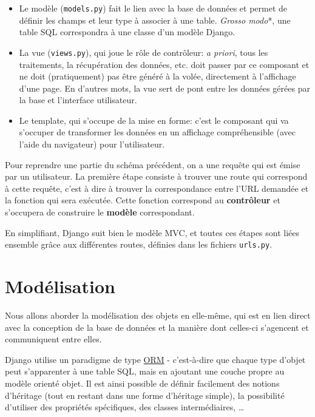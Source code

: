 \documentclass[11pt]{amsbook}
\begin{document}
\begin{itemize}

\item Le modèle (\texttt{models.py}) fait le lien avec la base de données et permet de définir les champs et leur type à associer à une table. \emph{Grosso modo}*, une table SQL correspondra à une classe d’un modèle Django.

\item La vue (\texttt{views.py}), qui joue le rôle de contrôleur: \emph{a priori}, tous les traitements, la récupération des données, etc. doit passer par ce composant et ne doit (pratiquement) pas être généré à la volée, directement à l’affichage d’une page. En d’autres mots, la vue sert de pont entre les données gérées par la base et l’interface utilisateur.

\item Le template, qui s’occupe de la mise en forme: c’est le composant qui va s’occuper de transformer les données en un affichage compréhensible (avec l’aide du navigateur) pour l’utilisateur.

\end{itemize}


Pour reprendre une partie du schéma précédent, on a une requête qui est émise par un utilisateur. La première étape consiste à trouver une route qui correspond à cette requête, c’est à dire à trouver la correspondance entre l’URL demandée et la fonction qui sera exécutée. Cette fonction correspond au \textbf{contrôleur} et s’occupera de construire le \textbf{modèle} correspondant.


En simplifiant, Django suit bien le modèle MVC, et toutes ces étapes sont liées ensemble grâce aux différentes routes, définies dans les fichiers \texttt{urls.py}.


\hypertarget{x-modélisation}{\chapter{Modélisation}}
Nous allons aborder la modélisation des objets en elle-même, qui est en lien direct avec la conception de la base de données et la manière dont celles-ci s’agencent et communiquent entre elles.


Django utilise un paradigme de type \href{https://fr.wikipedia.org/wiki/Mapping_objet-relationnel}{ORM} - c’est-à-dire que chaque type d’objet peut s’apparenter à une table SQL, mais en ajoutant une couche propre au modèle orienté objet.
Il est ainsi possible de définir facilement des notions d’héritage (tout en restant dans une forme d’héritage simple), la possibilité d’utiliser des propriétés spécifiques, des classes intermédiaires, …​
\end{document}
